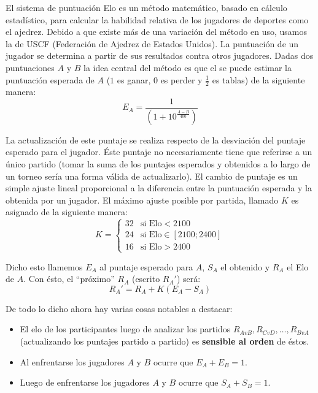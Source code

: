 \documentclass[a4paper]{article}
\begin{document}
El sistema de puntuación Elo es un método matemático, basado en cálculo estadístico, para calcular la habilidad relativa de los jugadores de deportes como el ajedrez. Debido a que existe más de una variación del método en uso, usamos la de USCF (Federación de Ajedrez de Estados Unidos). 
La puntuación de un jugador se determina a partir de sus resultados contra otros jugadores. Dadas dos puntuaciones $A$ y $B$ la idea central del método es que el se puede estimar la puntuación esperada de $A$ ($1$ es ganar, $0$ es perder y $\frac{1}{2}$ es tablas) de la siguiente manera:
\begin{equation}
    E_A = \frac{1}{(1 + 10^{\frac{A - B}{400}})}
    \label{eq:Elo-Expected-Score}
\end{equation}

La actualización de este puntaje se realiza respecto de la desviación del puntaje esperado para el jugador. Éste puntaje no necesariamente tiene que referirse a un único partido (tomar la suma de los puntajes esperados y obtenidos a lo largo de un torneo sería una forma válida de actualizarlo). El cambio de puntaje es un simple ajuste lineal proporcional a la diferencia entre la puntuación esperada y la obtenida por un jugador. El máximo ajuste posible por partida, llamado $K$ es asignado de la siguiente manera:
\begin{equation}
    K =
    \begin{cases}
        32 & \text{si Elo} < 2100 \\
        24 & \text{si Elo} \in [2100; 2400] \\
        16 & \text{si Elo} > 2400
    \end{cases}
    \label{eq:Elo-K-Factor}
\end{equation}

Dicho esto llamemos $E_A$ al puntaje esperado para $A$, $S_A$ el obtenido y $R_A$ el Elo de $A$. Con ésto, el ``próximo'' $R_A$ (escrito $R_A'$) será:
\begin{equation}
    R_A' = R_A + K (E_A - S_A)
    \label{eq:Elo-Update}
\end{equation}

De todo lo dicho ahora hay varias cosas notables a destacar:
\begin{itemize}
    \item El elo de los participantes luego de analizar los partidos $R_{AvB}, R_{CvD}, \dots, R_{BvA}$ (actualizando los puntajes partido a partido) es \textbf{sensible al orden} de éstos.
    \item Al enfrentarse los jugadores $A$ y $B$ ocurre que $E_A + E_B = 1$.
    \item Luego de enfrentarse los jugadores $A$ y $B$ ocurre que $S_A + S_B = 1$.
\end{itemize}
\end{document}

